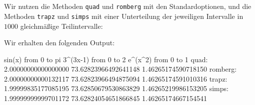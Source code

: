 \section{}

Wir nutzen die Methoden \texttt{quad} und \texttt{romberg} mit den Standardoptionen, und die Methoden \texttt{trapz} und \texttt{simps} mit einer Unterteilung der jeweiligen Intervalle in $1000$ gleichmäßige Teilintervalle:



Wir erhalten den folgenden Output:

\begin{consoleoutput}
         sin(x) from 0 to pi  3^(3x-1) from 0 to 2  e^(x^2) from 0 to 1 
quad:    2.00000000000000000  73.62823966492641148  1.46265174590718150
romberg: 2.00000000000132117  73.62823966494875094  1.46265174591010316
trapz:   1.99999835177085195  73.62850679530863829  1.46265219986153205
simps:   1.99999999999701172  73.62824054651866845  1.46265174667154541
\end{consoleoutput}

